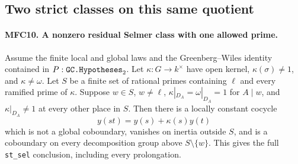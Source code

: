 \documentclass[11pt,a4paper]{article}
\numberwithin{equation}{section}
\theoremstyle{remark}\newtheorem{remark}[theorem]{Remark}
\begin{document}
\subsection{Two strict classes on this same quotient}

\paragraph{MFC10. A nonzero residual Selmer class with one allowed prime.}
\label{claim:MFC10}
Assume the finite local and global laws and the Greenberg--Wiles
identity contained in \(P:\texttt{GC.\allowbreak Hypotheses}_{2}\).
Let \(\kappa:G\to k^\times\) have open kernel,
\(\kappa(\sigma)\ne1\), and \(\kappa\ne\omega\).
Let \(S\) be a finite set of rational primes containing
\(\ell\) and every ramified prime of \(\kappa\).
Suppose \(w\in S\), \(w\ne\ell\),
\(\kappa|_{D_A}=\omega|_{D_A}=1\) for \(A\mid w\),
and \(\kappa|_{D_A}\ne1\) at every other place in \(S\).
Then there is a locally constant cocycle
\[
 y(st)=y(s)+\kappa(s)y(t)                                  \tag{MFC.24}
\]
which is not a global coboundary, vanishes on inertia outside
\(S\), and is a coboundary on every decomposition group above
\(S\setminus\{w\}\).  This gives the full
\texttt{st\_\allowbreak sel} conclusion, including every prolongation.
\end{document}
